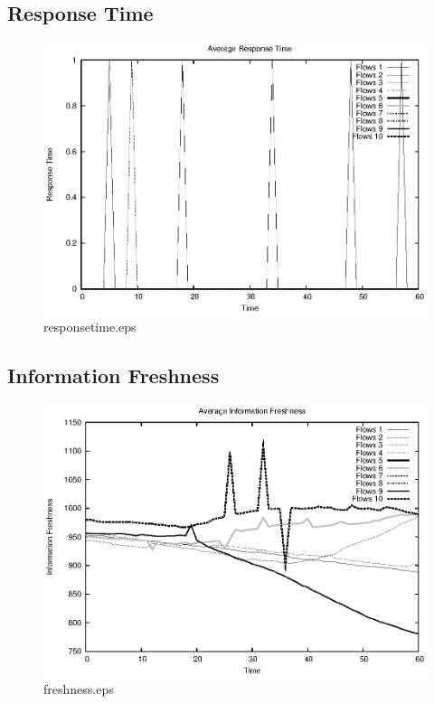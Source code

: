 \documentclass{elsart}
\begin{document}
\clearpage
\subsection{Response Time}

\begin{figure}[ht]
\centering
\includegraphics{Scenario3PubSub/responsetime.eps}
\caption{responsetime.eps}\label{fig:responsetime}
\end{figure}

\clearpage
\subsection{Information Freshness}

\begin{figure}[ht]
\centering
\includegraphics{Scenario3PubSub/freshness.eps}
\caption{freshness.eps}\label{fig:freshness}
\end{figure}
\end{document}
